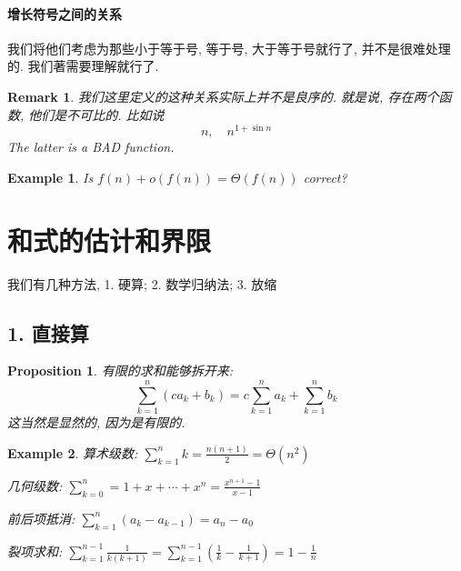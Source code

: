 \documentclass[a4paper, 10pt]{ctexart} %
\newtheorem{example}{Example}
\newtheorem{remark}{Remark}
\newtheorem{proposition}{Proposition}
\begin{document}
\paragraph*{增长符号之间的关系}
我们将他们考虑为那些小于等于号, 等于号, 大于等于号就行了, 并不是很难处理的. 我们著需要理解就行了.

\begin{remark}
    我们这里定义的这种关系实际上并不是良序的. 就是说, 存在两个函数, 他们是不可比的. 比如说
    $$ n ,\quad  n ^{1 + \sin  n }$$
    The latter is a BAD function.
\end{remark}
\begin{example}
    Is $f\left(n\right) + o \left(f \left(n\right) \right) = \Theta \left(f \left(n\right)\right)$ correct?
\end{example}

\section{和式的估计和界限}
我们有几种方法, 1. 硬算; 2. 数学归纳法; 3. 放缩

\subsection{1. 直接算}
\begin{proposition}
    有限的求和能够拆开来:
    $$\sum_{k=1} ^{n} \left(c a_{k} + b_{k}\right) = c \sum_{k=1} ^{n} a_{k} + \sum_{k=1} ^{n} b_{k}$$
    这当然是显然的, 因为是有限的. 
\end{proposition}
\begin{example}
算术级数: $\displaystyle \sum_{k=1} ^{n} k = \frac{n\left(n+1\right)}{2} = \Theta \left(n^{2}\right)$

几何级数: $\displaystyle \sum_{k=0} ^{n} = 1 + x + \cdots +x^{n} = \frac{x ^{n+1} -1}{x - 1}$

前后项抵消: $\displaystyle \sum_{k=1} ^{n} \left(a_{k} - a_{k-1} \right) = a_{n} - a_{0}$

裂项求和: $\displaystyle \sum_{k=1} ^{n-1   } \frac{1 }{k \left(k+1\right)} = \sum_{k=1} ^{n-1} \left(\frac{1}{k} - \frac{1}{k+1}\right) = 1 - \frac{1}{n}$
\end{example}
\end{document}
